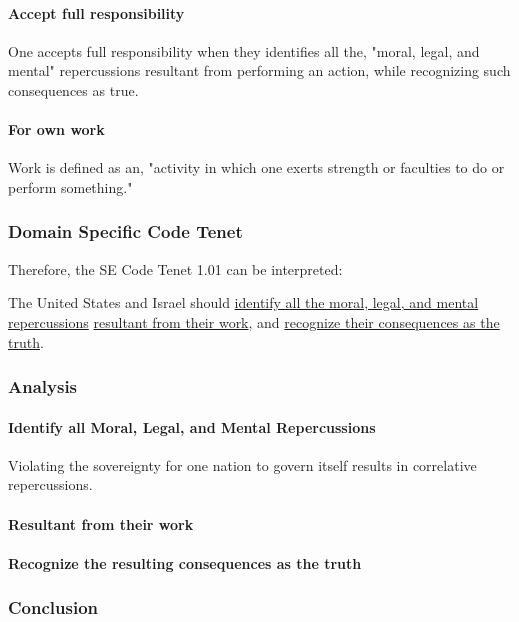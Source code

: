 \documentclass[12pt]{article}
\begin{document}
\begin{multicols}{2}
\paragraph{Accept full responsibility}
One accepts full responsibility when they identifies all the, "moral, legal, and mental" repercussions resultant from performing an action, while recognizing such consequences as true.\cite{acceptDefinition}\cite{responsibilityDefinition}

\paragraph{For own work}
Work is defined as an, "activity in which one exerts strength or faculties to do or perform something."\cite{workDefinition}

\subsubsection{Domain Specific Code Tenet}

Therefore, the SE Code Tenet 1.01 can be interpreted:
\begin{framed}
The United States and Israel should \ul{identify all the moral, legal, and mental repercussions} \ul{resultant from their work}, and \ul{recognize their consequences as the truth}.
\end{framed}

\subsubsection{Analysis}

\paragraph{Identify all Moral, Legal, and Mental Repercussions}

Violating the sovereignty for one nation to govern itself results in correlative repercussions.

\paragraph{Resultant from their work}

\paragraph{Recognize the resulting consequences as the truth}

\subsubsection{Conclusion}


\end{multicols}
\end{document}
